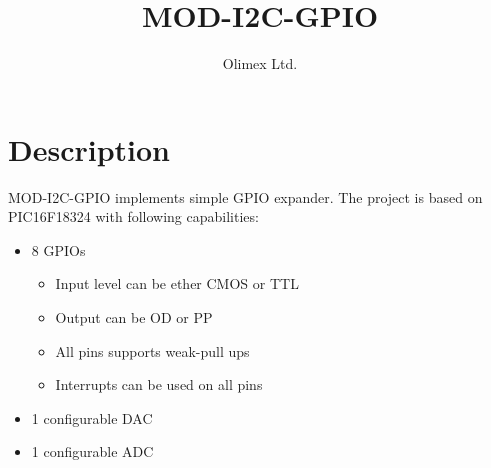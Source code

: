 \documentclass{article}
\title{MOD-I2C-GPIO}
\author{Olimex Ltd.}
\begin{document}
	\maketitle
	\tableofcontents
	\listoffigures
	\pagebreak

	\section{Description}
		MOD-I2C-GPIO implements simple GPIO expander.
		The project is based on PIC16F18324 with following capabilities:
		\begin{itemize}
			\item 8 GPIOs
			\begin{itemize}
				\item Input level can be ether CMOS or TTL
				\item Output can be OD or PP
				\item All pins supports weak-pull ups
				\item Interrupts can be used on all pins
			\end{itemize}
			\item 1 configurable DAC
			\item 1 configurable ADC
		\end{itemize}
\end{document}
